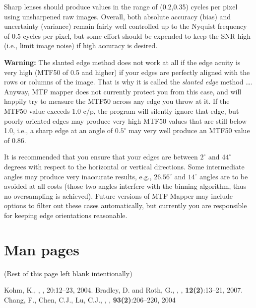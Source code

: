 \documentclass[a4paper]{article}
\begin{document}
Sharp lenses should produce values in the range of (0.2,0.35) cycles per
pixel using unsharpened raw images.  Overall, both absolute accuracy (bias)
and uncertainty (variance) remain fairly well controlled up to the Nyquist
frequency of 0.5 cycles per pixel, but some effort should be expended to
keep the SNR high (i.e., limit image noise) if high accuracy is desired.

\textbf{Warning:} The slanted edge method does not work at all if the edge
acuity is very high (MTF50 of 0.5 and higher) if your edges
are perfectly aligned with the rows or columns of the image. That is why it
is called the \emph{slanted edge} method \ldots. Anyway, MTF mapper does not
currently protect you from this case, and will happily try to measure the
MTF50 across any edge you throw at it. If the MTF50 value exceeds 1.0 c/p,
the program will silently ignore that edge, but poorly oriented edges may
produce very high MTF50 values that are still below 1.0, i.e., a sharp edge at an
angle of $0.5^\circ$ may very well produce an MTF50 value of 0.86. 

It is
recommended that you ensure that your edges are between $2^\circ$ and
$44^\circ$ degrees with respect to the horizontal or vertical directions.
Some intermediate angles may produce very inaccurate results, e.g.,
$26.56^\circ$ and $14^\circ$ angles are to be avoided at all costs (those
two angles interfere with the binning algorithm, thus no oversampling is
achieved). Future versions of MTF Mapper may include options to filter out these cases
automatically, but currently you are responsible for keeping edge orientations
reasonable.

\section{Man pages}
\begin{center}
(Rest of this page left blank intentionally)
\end{center}





\begin{thebibliography}{9}
 Kohm, K., , , 20:12--23, 2004.
 Bradley, D. and Roth, G.,
,
, \textbf{12(2)}:13--21,
2007.
 Chang, F., Chen, C.J., Lu, C.J.,
,
, \textbf{93(2)}:206--220,
2004
\end{thebibliography}
\end{document}
